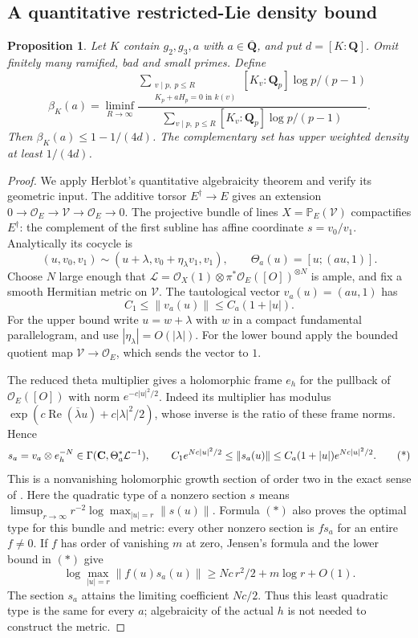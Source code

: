 \documentclass[11pt]{article}
\newtheorem{proposition}[theorem]{Proposition}
\theoremstyle{definition}\newtheorem{definition}[theorem]{Definition}
\theoremstyle{remark}\newtheorem{remark}[theorem]{Remark}
\newcommand{\Q}{\mathbf Q}\newcommand{\Z}{\mathbf Z}
\newcommand{\Qb}{\overline{\mathbf Q}}\newcommand{\Fp}{\mathbf F_p}
\begin{document}
\subsection{A quantitative restricted-Lie density bound}
\begin{proposition}\label{prop:restricted-density}
Let $K$ contain $g_2,g_3,a$ with $a\in\Qb$, and put $d=[K:\Q]$. Omit finitely many ramified, bad and small primes. Define
\[
 \beta_K(a)=\liminf_{R\to\infty}
 \frac{\displaystyle\sum_{\substack{v\mid p,\ p\le R\\ K_p+aH_p=0\text{ in }k(v)}}
                  [K_v:\Q_p]\log p/(p-1)}
      {\displaystyle\sum_{v\mid p,\ p\le R}[K_v:\Q_p]\log p/(p-1)}.
\]
Then $\beta_K(a)\le1-1/(4d)$. The complementary set has upper weighted density at least $1/(4d)$.
\end{proposition}
\begin{proof}
We apply Herblot's quantitative algebraicity theorem and verify its geometric input. The additive torsor $E^\dagger\to E$ gives an extension
$0\to\mathcal O_E\to\mathcal V\to\mathcal O_E\to0$. The projective bundle of lines
$X=\mathbb P_E(\mathcal V)$ compactifies $E^\dagger$: the complement of the first subline has affine coordinate $s=v_0/v_1$. Analytically its cocycle is
\[
 (u,v_0,v_1)\sim(u+\lambda,v_0+\eta_\lambda v_1,v_1),
 \qquad \Theta_a(u)=[u;(au,1)].
\]
Choose $N$ large enough that
$\mathcal L=\mathcal O_X(1)\otimes\pi^*\mathcal O_E([O])^{\otimes N}$ is ample, and fix a smooth Hermitian metric on $\mathcal V$. The tautological vector $v_a(u)=(au,1)$ has
\[
                  C_1\le\|v_a(u)\|\le C_a(1+|u|).
\]
For the upper bound write $u=w+\lambda$ with $w$ in a compact fundamental parallelogram, and use $|\eta_\lambda|=O(|\lambda|)$. For the lower bound apply the bounded quotient map $\mathcal V\to\mathcal O_E$, which sends the vector to $1$.

The reduced theta multiplier gives a holomorphic frame $e_h$ for the pullback of $\mathcal O_E([O])$ with norm $e^{-c|u|^2/2}$. Indeed its multiplier has modulus
$\exp(c\operatorname{Re}(\overline\lambda u)+c|\lambda|^2/2)$, whose inverse is the ratio of these frame norms. Hence
\[
 s_a=v_a\otimes e_h^{-N}\in\Gamma(\mathbf C,\Theta_a^*\mathcal L^{-1}),\qquad
 C_1e^{Nc|u|^2/2}\le\|s_a(u)\|
       \le C_a(1+|u|)e^{Nc|u|^2/2}.                       \tag{*}
\]
This is a nonvanishing holomorphic growth section of order two in the exact sense of \cite[Definition 5.1, p.~29; Definitions 5.4--5.5, p.~31]{Herblot}. Here the quadratic type of a nonzero section $s$ means $\limsup_{r\to\infty}r^{-2}\log\max_{|u|=r}\|s(u)\|$. Formula $(*)$ also proves the optimal type for this bundle and metric: every other nonzero section is $f s_a$ for an entire $f\ne0$. If $f$ has order of vanishing $m$ at zero, Jensen's formula and the lower bound in $(*)$ give
\[
 \log\max_{|u|=r}\|f(u)s_a(u)\|
          \ge Nc\,r^2/2+m\log r+O(1).
\]
The section $s_a$ attains the limiting coefficient $Nc/2$. Thus this least quadratic type is the same for every $a$; algebraicity of the actual $h$ is not needed to construct the metric.


\end{proof}
\end{document}
